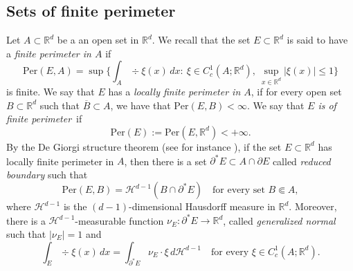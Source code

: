 \documentclass[JEP,XML,SOM,Unicode]{cedram}
\newcommand{\Per}{\mathrm{Per}}
\theoremstyle{plain}
\theoremstyle{definition}
\def\R{\mathbb{R}}
\def\HH{\mathcal{H}}
\begin{document}
\subsection{Sets of finite perimeter}\label{sub:perimeter}
Let $A\subset\R^d$ be a an open set in $\R^d$. We recall that the set $E\subset\R^d$ is said to have a {\it finite perimeter in $A$} if\enlargethispage{.5\baselineskip}%
\begin{equation}\label{e:per}\Per(E,A)=\sup\Big\{\int_{A}\div\xi(x)\,dx:\ \xi\in C^1_c(A;\R^d),\ \sup_{x\in \R^d}|\xi (x)|\le 1\Big\}
\end{equation}
is finite. We say that $E$ has a {\it locally finite perimeter in $A$}, if for every open set $B\subset \R^d$ such that $\overline B\subset A$, we have that $\Per(E,B)<\infty$. We say that {\it $E$ is of finite perimeter}~if\vspace*{-3pt}
\[\Per(E):=\Per(E,\R^d)<+\infty.\]
By the De Giorgi structure theorem (see for instance \cite[Th.\,II.4.9]{maggi}), if the set $E\subset \R^d$ has locally finite perimeter in $A$, then there is a set $\partial^\ast E\subset A\cap \partial E$ called {\it reduced boundary} such that
\[\Per(E,B)=\HH^{d-1}(B\cap\partial^\ast E)\quad\text{for every set } B\Subset A,\]
where $\HH^{d-1}$ is the $(d-1)$-dimensional Hausdorff measure in $\R^d$.
Moreover, there is a $\HH^{d-1}$-measurable function $\nu_E:\partial^\ast E\to\R^d$, called {\it generalized normal} such that $|\nu_E|=1$ and\vspace*{-3pt}
\[\int_E\div\xi(x)\,dx=\int_{\partial^\ast E}\nu_E\cdot \xi\,d\HH^{d-1}\quad\text{for every } \xi\in C^1_c(A;\R^d).\]
\end{document}

